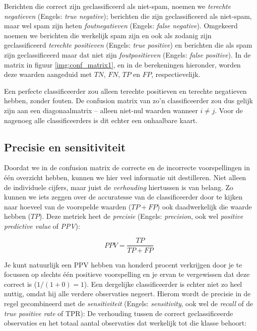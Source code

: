 Berichten die correct zijn geclassificeerd als niet-spam, noemen we \textit{terechte negatieven} (Engels: \textit{true negative}); berichten die zijn geclassificeerd als niet-spam, maar wel spam zijn heten \textit{foutnegatieven} (Engels: \textit{false negative}). Omgekeerd noemen we berichten die werkelijk spam zijn en ook als zodanig zijn geclassificeerd \textit{terechte positieven} (Engels: \textit{true positive}) en berichten die als spam zijn geclassificeerd maar dat niet zijn \textit{foutpositieven} (Engels: \textit{false positive}). In de matrix in figuur \ref{img:conf_matrix1}, en in de berekeningen hieronder, worden deze waarden aangeduid met $TN$, $FN$, $TP$ en $FP$, respectievelijk.

Een perfecte classificeerder zou alleen terechte positieven en terechte negatieven hebben, zonder fouten. De confusion matrix van zo'n classificeerder zou dus gelijk zijn aan een diagonaalmatrix – alleen niet-nul waarden wanneer $i \neq j$. Voor de nagenoeg alle classificeerders is dit echter een onhaalbare kaart.

\subsection{Precisie en sensitiviteit}
Doordat we in de confusion matrix de correcte en de incorrecte voorspellingen in één overzicht hebben, kunnen we hier veel informatie uit destilleren. Niet alleen de individuele cijfers, maar juist de \textit{verhouding} hiertussen is van belang. Zo kunnen we iets zeggen over de accuratesse van de classificeerder door te kijken naar hoeveel van de voorspelde waarden ($TP+FP$) ook daadwerkelijk die waarde hebben ($TP$). Deze metriek heet de \textit{precisie} (Engels: \textit{precision}, ook wel \textit{positive predictive value} of \textit{PPV}):

\[
  PPV = \frac{TP}{TP+FP}
\]

Je kunt natuurlijk een PPV hebben van honderd procent verkrijgen door je te focussen op slechts één positieve voorspelling en je ervan te vergewissen dat deze correct is ($1/(1+0)=1$). Een dergelijke classificeerder is echter niet zo heel nuttig, omdat hij alle verdere observaties negeert. Hierom wordt de precisie in de regel gecombineerd met de \textit{sensitiviteit} (Engels: \textit{sensitivity}, ook wel de \textit{recall} of de  \textit{true positive rate} of TPR): De verhouding tussen de correct geclassificeerde observaties en het totaal aantal observaties dat werkelijk tot die klasse behoort:

